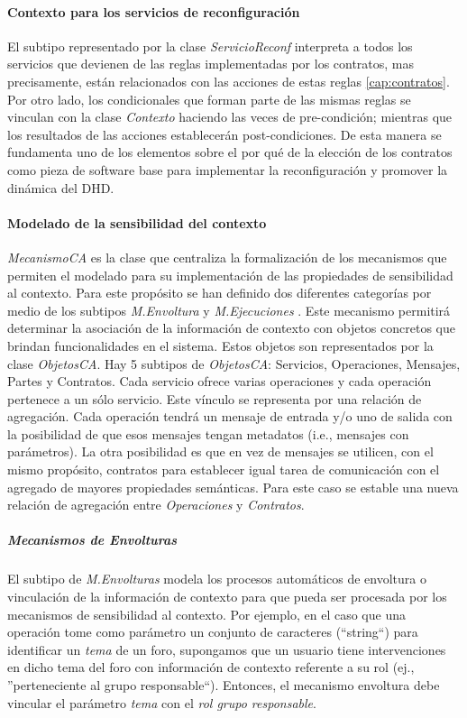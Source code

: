 \paragraph{Contexto para los servicios de reconfiguración}

El subtipo representado por la clase \textit{ServicioReconf} interpreta a todos
los servicios que devienen de las reglas implementadas por los contratos, mas
precisamente, están relacionados con las acciones de estas reglas
\ref{cap:contratos}. Por otro lado, los condicionales que forman parte de las
mismas reglas se vinculan con la clase \textit{Contexto} haciendo las veces de
pre-condición; mientras que los resultados de las acciones
establecerán  post-condiciones. De esta manera se fundamenta uno de los
elementos sobre el por qué de la elección de los contratos como
pieza de software base para implementar la reconfiguración y promover la
dinámica del DHD.  



\paragraph{Modelado de la sensibilidad del contexto}

\textit{MecanismoCA} es la clase que centraliza la formalización de los
mecanismos que permiten el modelado para su implementación de las propiedades
de sensibilidad al contexto. Para este propósito se han definido dos
diferentes categorías por medio de los subtipos \textit{M.Envoltura} y
\textit{M.Ejecuciones }. Este mecanismo permitirá determinar la asociación de
la información de contexto  con objetos concretos que brindan funcionalidades
en el sistema. Estos objetos son representados por la clase \textit{ObjetosCA}.
Hay 5 subtipos de \textit{ObjetosCA}: Servicios, Operaciones, Mensajes, Partes y
Contratos. Cada servicio ofrece varias operaciones y cada operación pertenece
a un sólo servicio. Este vínculo se representa por una relación de
agregación. Cada operación tendrá un mensaje de entrada y/o uno de salida
con la posibilidad de que esos mensajes tengan metadatos (i.e.,
mensajes con parámetros). La otra posibilidad es que en vez de mensajes se
utilicen, con el mismo propósito, contratos para establecer igual tarea de
comunicación con el agregado de mayores propiedades semánticas.
Para este caso se estable una nueva relación de agregación entre
\textit{Operaciones} y \textit{Contratos}.


\subparagraph{Mecanismos de Envolturas}
El subtipo de \textit{M.Envolturas} modela los procesos automáticos de envoltura
o vinculación de la información de contexto para que pueda ser procesada por
los mecanismos de sensibilidad al contexto. Por ejemplo, en el caso que una
operación tome como parámetro un conjunto de caracteres (``string``) para
identificar un \textit{tema} de un foro, supongamos que un usuario tiene
intervenciones en dicho tema del foro con información de contexto referente a su
rol (ej., ''perteneciente al grupo responsable``). Entonces, el mecanismo
envoltura debe vincular el parámetro \textit{tema} con el \textit{rol grupo
responsable}.

